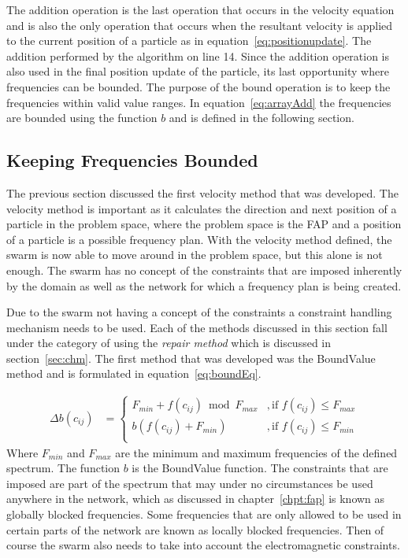 The addition operation is the last operation that occurs in the velocity equation and is also the only operation that occurs when the resultant velocity is applied to the current position of a particle as in equation~\ref{eq:positionupdate}. The addition performed by the algorithm on line 14. Since the addition operation is also used in the final position update of the particle, its last opportunity where frequencies can be bounded.  The purpose of the bound operation is to keep the frequencies within valid value ranges. In equation~\ref{eq:arrayAdd} the frequencies are bounded using the function $b$ and is defined in the following section.
\subsection{Keeping Frequencies Bounded}
The previous section discussed the first velocity method that was developed. The velocity method is important as it calculates the direction and next position of a particle in the problem space, where the problem space is the \gls{FAP} and a position of a particle is a possible frequency plan. With the velocity method defined, the swarm is now able to move around in the problem space, but this alone is not enough. The swarm has no concept of the constraints that are imposed inherently by the domain as well as the network for which a frequency plan is being created.

Due to the swarm not having a concept of the constraints a constraint handling mechanism needs to be used. Each of the methods discussed in this section fall under the category of using the \emph{repair method} which is discussed in section~\ref{sec:chm}. The first method that was developed was the BoundValue method and is formulated in equation~\ref{eq:boundEq}.

\begin{align}
\label{eq:boundEq}
    \Delta b(c_{ij}) &= 
    \begin{cases}
    F_{min} + f(c_{ij}) \bmod F_{max} &, \text{if $f(c_{ij}) \leq F_{max}$}\\ 
    b(f(c_{ij}) + F_{min}) &, \text{if $f(c_{ij}) \leq F_{min}$}\\ 
    \end{cases}
\end{align}
Where $F_{min}$ and $F_{max}$ are the minimum and maximum frequencies of the defined spectrum. The function $b$ is the BoundValue function. The constraints that are imposed are part of the spectrum that may under no circumstances be used anywhere in the network, which as discussed in chapter~\ref{chpt:fap} is known as globally blocked frequencies. Some frequencies that are only allowed to be used in certain parts of the network are known as locally blocked frequencies. Then of course the swarm also needs to take into account the electromagnetic constraints.

